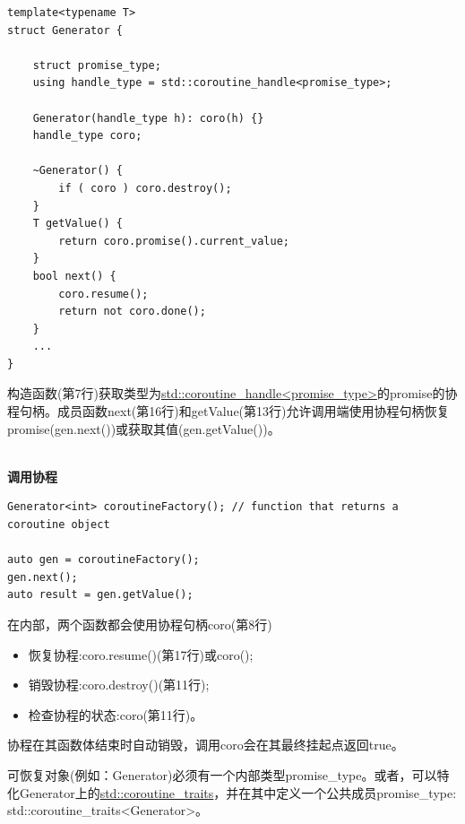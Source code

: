 \begin{lstlisting}[style=styleCXX]
template<typename T>
struct Generator {

	struct promise_type;
	using handle_type = std::coroutine_handle<promise_type>;
	
	Generator(handle_type h): coro(h) {}
	handle_type coro;
	
	~Generator() {
		if ( coro ) coro.destroy();
	}
	T getValue() {
		return coro.promise().current_value;
	}
	bool next() {
		coro.resume();
		return not coro.done();
	}
	...
}
\end{lstlisting}

构造函数(第7行)获取类型为\href{https://en.cppreference.com/w/cpp/coroutine/coroutine_handle}{std::coroutine\_handle<promise\_type>}的promise的协程句柄。成员函数next(第16行)和getValue(第13行)允许调用端使用协程句柄恢复promise(gen.next())或获取其值(gen.getValue())。

\hspace*{\fill} \\ %
\noindent
\textbf{调用协程}
\begin{lstlisting}[style=styleCXX]
Generator<int> coroutineFactory(); // function that returns a coroutine object

auto gen = coroutineFactory();
gen.next();
auto result = gen.getValue();
\end{lstlisting}

在内部，两个函数都会使用协程句柄coro(第8行)

\begin{itemize}
\item 
恢复协程:coro.resume()(第17行)或coro();

\item 
销毁协程:coro.destroy()(第11行);

\item 
检查协程的状态:coro(第11行)。
\end{itemize}

协程在其函数体结束时自动销毁，调用coro会在其最终挂起点返回true。

\begin{tcolorbox}[breakable,enhanced jigsaw,colback=red!5!white,colframe=red!75!black,title={可恢复对象需要内部类型promise\_type}]
可恢复对象(例如：Generator)必须有一个内部类型promise\_type。或者，可以特化Generator上的\href{https://en.cppreference.com/w/cpp/coroutine/coroutine_traits}{std::coroutine\_traits}，并在其中定义一个公共成员promise\_type: std::coroutine\_traits<Generator>。
\end{tcolorbox}

